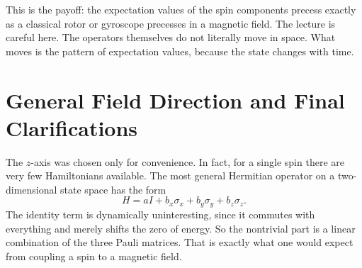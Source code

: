 This is the payoff: the expectation values of the spin components precess exactly as a classical rotor or gyroscope precesses in a magnetic field. The lecture is careful here. The operators themselves do not literally move in space. What moves is the pattern of expectation values, because the state changes with time.

\section{General Field Direction and Final Clarifications}

The \(z\)-axis was chosen only for convenience. In fact, for a single spin there are very few Hamiltonians available. The most general Hermitian operator on a two-dimensional state space has the form
\begin{equation}
H = aI + b_x\sigma_x + b_y\sigma_y + b_z\sigma_z.
\end{equation}
The identity term is dynamically uninteresting, since it commutes with everything and merely shifts the zero of energy. So the nontrivial part is a linear combination of the three Pauli matrices. That is exactly what one would expect from coupling a spin to a magnetic field.

